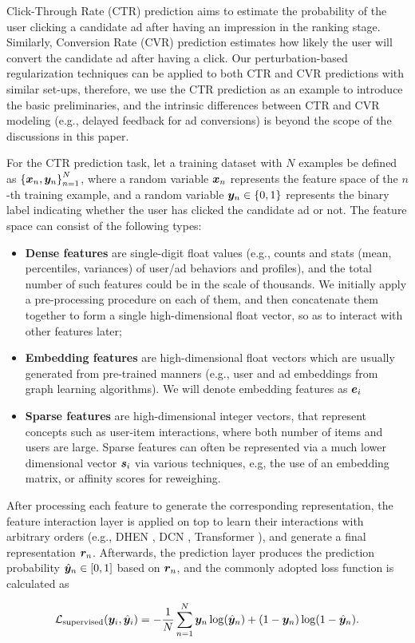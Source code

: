 Click-Through Rate (CTR) prediction aims to estimate the probability of the user clicking a candidate ad after having an impression in the ranking stage. Similarly, Conversion Rate (CVR) prediction estimates how likely the user will convert the candidate ad after having a click. Our perturbation-based regularization techniques can be applied to both CTR and CVR predictions with similar set-ups, therefore, we use the CTR prediction as an example to introduce the basic preliminaries, and the intrinsic differences between CTR and CVR modeling (e.g., delayed feedback for ad conversions) is beyond the scope of the discussions in this paper.

For the CTR prediction task, let a training dataset with $\mathit{N}$ examples be defined as $\left\{{\bm{x}}_n, {{\bm{y}}}_n\right\}_{n=1}^{N}$, where a random variable ${\bm{x}}_n$ represents the feature space of the $n$-th training example, and a random variable ${\bm{y}}_n\in \{0, 1\}$ represents the binary label indicating whether the user has clicked the candidate ad or not. The feature space can consist of the following types:
\begin{itemize}
    \item \textbf{Dense features} are single-digit float values (e.g., counts and stats (mean, percentiles, variances) of user/ad behaviors and profiles), and the total number of such features could be in the scale of thousands. 
    We initially apply a pre-processing procedure on each of them, and then concatenate them together to form a single high-dimensional float vector, so as to interact with other features later;\\
    
    \item \textbf{Embedding features} are high-dimensional float vectors which are usually generated from pre-trained manners (e.g., user and ad embeddings from graph learning algorithms). We will denote embedding features as ${\bm{e}}_i$\\ 
    
    \item \textbf{Sparse features} are high-dimensional integer vectors, that represent concepts such as user-item interactions, where both number of items and users are large. Sparse features can often be represented via a much lower dimensional vector ${\bm{s}}_i$ via various techniques, e.g, the use of an embedding matrix, or affinity scores for reweighing.
    
\end{itemize}

After processing each feature to generate the corresponding representation, the feature interaction layer is applied on top to learn their interactions with arbitrary orders (e.g., DHEN \cite{DHEN}, DCN \cite{DCN}, Transformer \cite{Transformer}), and generate a final representation ${\bm{r}}_n$. Afterwards, the prediction layer produces the prediction probability $\hat{{\bm{y}}}_n \in [0, 1]$ based on ${\bm{r}}_n$, and the commonly adopted loss function is calculated as  

\begin{align}
\label{eq:bce}
   \mathcal{L_{\text{supervised}}}({\bm{y}}_i,\hat{{\bm{y}}}_i) = -\frac{1}{N}\sum_{n = 1}^{N} {\bm{y}}_n \log (\hat{{\bm{y}}}_n) + (1 - {\bm{y}}_n) \log (1 - \hat{{\bm{y}}}_n).
\end{align}